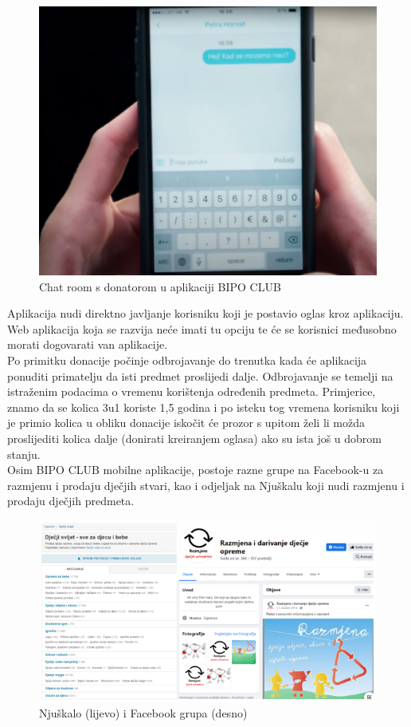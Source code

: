 		\begin{figure}[h!]
			\center
			\includegraphics{./slike/Picture5.png}
			\caption{ Chat room s donatorom u aplikaciji BIPO CLUB}
			\label{fig5}
		\end{figure}
		\newline
		Aplikacija nudi direktno javljanje korisniku koji je postavio oglas kroz aplikaciju. Web aplikacija koja se razvija neće imati tu opciju te će se korisnici međusobno morati dogovarati van aplikacije.\\
		\newline
		Po primitku donacije počinje odbrojavanje do trenutka kada će aplikacija ponuditi primatelju da isti predmet proslijedi dalje. Odbrojavanje se temelji na istraženim podacima o vremenu korištenja određenih predmeta. Primjerice, znamo da se kolica 3u1 koriste 1,5 godina i po isteku tog vremena korisniku koji je primio kolica u obliku donacije iskočit će prozor s upitom želi li možda proslijediti kolica dalje (donirati kreiranjem oglasa) ako su ista još u dobrom stanju. \\
		\newline
		Osim BIPO CLUB mobilne aplikacije, postoje razne grupe na Facebook-u za razmjenu i prodaju dječjih stvari, kao i odjeljak na Njuškalu koji nudi razmjenu i prodaju dječjih predmeta.\\
		\newline
		\begin{figure}[h!]
			\center
			\includegraphics[width = \linewidth]{./slike/Picture6.png}
			\caption{Njuškalo (lijevo) i Facebook grupa (desno)}
			\label{fig6}
		\end{figure}
